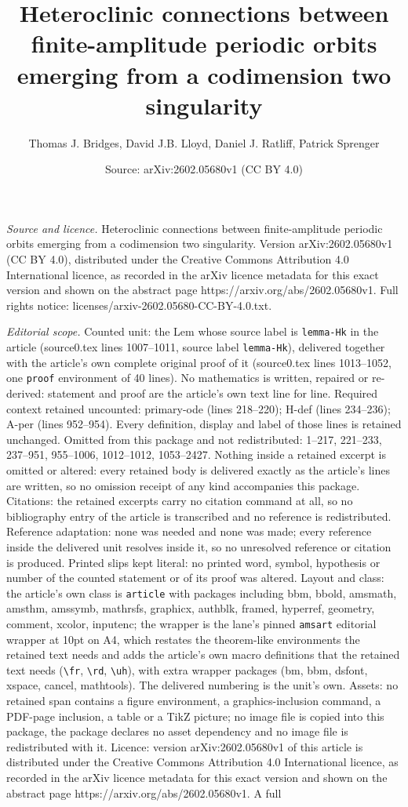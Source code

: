 \documentclass[10pt,a4paper]{amsart}
\title[Heteroclinic connections between finite-amplitude periodic o]{Heteroclinic connections between finite-amplitude periodic orbits emerging from a codimension two singularity}
\author{Thomas J. Bridges, David J.B. Lloyd, Daniel J. Ratliff, Patrick Sprenger}
\date{Source: arXiv:2602.05680v1 (CC BY 4.0)}
\begin{document}
\maketitle

\noindent\emph{Source and licence.} Heteroclinic connections between finite-amplitude periodic orbits emerging from a codimension two singularity. Version arXiv:2602.05680v1 (CC BY 4.0), distributed under the Creative Commons Attribution 4.0 International licence, as recorded in the arXiv licence metadata for this exact version and shown on the abstract page https://arxiv.org/abs/2602.05680v1. Full rights notice: licenses/arxiv-2602.05680-CC-BY-4.0.txt.\par\smallskip

\noindent\textit{Editorial scope.} Counted unit: the Lem whose source label is \texttt{lemma-Hk} in the article (source0.tex lines 1007--1011, source label \texttt{lemma-Hk}), delivered together with the article's own complete original proof of it (source0.tex lines 1013--1052, one \texttt{proof} environment of 40 lines). No mathematics is written, repaired or re-derived: statement and proof are the article's own text line for line. Required context retained uncounted: primary-ode (lines 218--220); H-def (lines 234--236); A-per (lines 952--954). Every definition, display and label of those lines is retained unchanged. Omitted from this package and not redistributed: 1--217, 221--233, 237--951, 955--1006, 1012--1012, 1053--2427. Nothing inside a retained excerpt is omitted or altered: every retained body is delivered exactly as the article's lines are written, so no omission receipt of any kind accompanies this package. Citations: the retained excerpts carry no citation command at all, so no bibliography entry of the article is transcribed and no reference is redistributed. Reference adaptation: none was needed and none was made; every reference inside the delivered unit resolves inside it, so no unresolved reference or citation is produced. Printed slips kept literal: no printed word, symbol, hypothesis or number of the counted statement or of its proof was altered. Layout and class: the article's own class is \texttt{article} with packages including bbm, bbold, amsmath, amsthm, amssymb, mathrsfs, graphicx, authblk, framed, hyperref, geometry, comment, xcolor, inputenc; the wrapper is the lane's pinned \texttt{amsart} editorial wrapper at 10pt on A4, which restates the theorem-like environments the retained text needs and adds the article's own macro definitions that the retained text needs (\texttt{\textbackslash fr}, \texttt{\textbackslash rd}, \texttt{\textbackslash uh}), with extra wrapper packages (bm, bbm, dsfont, xspace, cancel, mathtools). The delivered numbering is the unit's own. Assets: no retained span contains a figure environment, a graphics-inclusion command, a PDF-page inclusion, a table or a TikZ picture; no image file is copied into this package, the package declares no asset dependency and no image file is redistributed with it. Licence: version arXiv:2602.05680v1 of this article is distributed under the Creative Commons Attribution 4.0 International licence, as recorded in the arXiv licence metadata for this exact version and shown on the abstract page https://arxiv.org/abs/2602.05680v1. A full 
\end{document}
